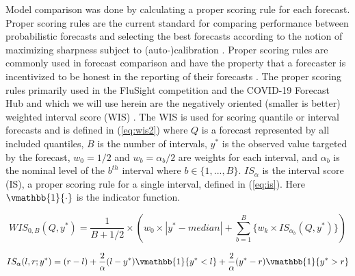 Model comparison was done by calculating a proper scoring rule for each 
forecast.
Proper scoring rules are the 
current standard for comparing performance between probabilistic forecasts 
and selecting the best forecasts according to the notion of maximizing 
sharpness subject to (auto-)calibration 
\cite[]{gneiting2007probabilistic, tsyplakov2013evaluation}. Proper scoring 
rules are commonly used in forecast comparison and have the property that a 
forecaster is incentivized to be honest in the reporting of their forecasts 
\cite[]{gneiting2007strictly, gneiting2014probabilistic}.
The proper scoring rules primarily used in the FluSight competition and the 
COVID-19 Forecast Hub and which we will use herein are the negatively oriented
(smaller is better)
weighted interval score (WIS)
\cite[]{mathis2024evaluation, bracher2021evaluating}.
The WIS is used for scoring quantile or interval 
forecasts 
\cite[]{gneiting2007strictly, gneiting2014probabilistic, bracher2021evaluating} 
and is defined in (\ref{eq:wis2}) where $Q$ is a forecast represented by all 
included quantiles, $B$ is the number of intervals,  $y^*$ is the observed 
value targeted by the forecast, $w_0 = 1/2$ and $w_b = \alpha_b / 2$ are 
weights for each interval, and $\alpha_b$ is the nominal level of the $b^{th}$ 
interval where $b \in \{1, ..., B\}$. 
$IS_{\alpha}$ is the interval score (IS), a proper scoring rule for a 
single interval, defined in (\ref{eq:is}). Here 
$\vmathbb{1}\{\cdot\}$ is the indicator function.


\begin{equation}
\label{eq:wis2}
        WIS_{0,B}(Q, y^*) = \frac{1}{B + 1/2} \times (w_0\times |y^* - median| + \sum_{b=1}^B \{w_k \times IS_{\alpha_b}(Q, y^*) \} )
\end{equation}

\begin{equation}
\label{eq:is}
        IS_{\alpha}(l,r;y^*) = (r-l) + \frac{2}{\alpha}(l - y^*)\vmathbb{1}\{y^* < l\} + \frac{2}{\alpha}(y^* - r) \vmathbb{1}\{y^* > r\}
\end{equation}


% 



